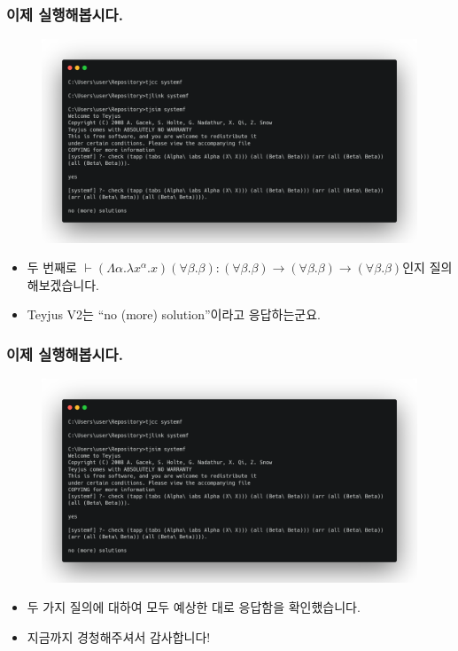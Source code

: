 \documentclass[slidestop,compress,mathserif]{beamer}
\begin{document}
    \begin{frame}
        \frametitle{이제 실행해봅시다.}
        \begin{figure}[h]
            \begin{center}
                \includegraphics[width=0.9\linewidth]{fin.png}
            \end{center}
        \end{figure}
        \begin{itemize}
            \item 두 번째로 $\vdash \left( \Lambda \alpha . \lambda x^{\alpha} . x \right) \left( \forall \beta . \beta \right) : \left( \forall \beta . \beta \right) \to \left( \forall \beta . \beta \right) \to \left( \forall \beta . \beta \right)$인지 질의해보겠습니다.
            \item Teyjus V2는 ``no (more) solution''이라고 응답하는군요.
        \end{itemize}
    \end{frame}
    
    \begin{frame}
        \frametitle{이제 실행해봅시다.}
        \begin{figure}[h]
            \begin{center}
                \includegraphics[width=0.9\linewidth]{fin.png}
            \end{center}
        \end{figure}
        \begin{itemize}
            \item 두 가지 질의에 대하여 모두 예상한 대로 응답함을 확인했습니다.
            \item 지금까지 경청해주셔서 감사합니다!
        \end{itemize}
    \end{frame}
\end{document}
